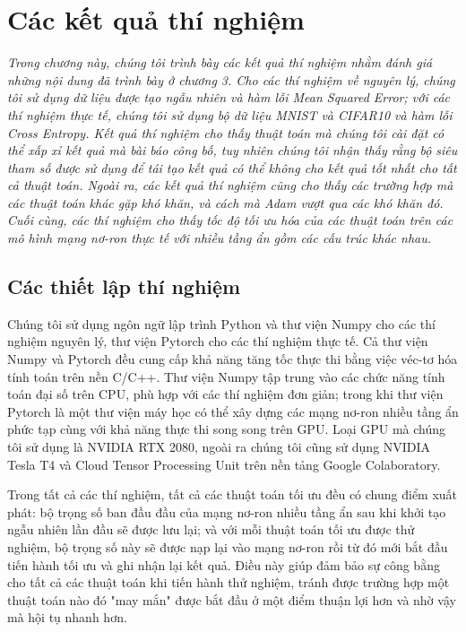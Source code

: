 \chapter{Các kết quả thí nghiệm}
\label{Chapter4}

\textit{Trong chương này, chúng tôi trình bày các kết quả thí nghiệm nhằm đánh giá những nội dung đã trình bày ở chương 3. Cho các thí nghiệm về nguyên lý, chúng tôi sử dụng dữ liệu được tạo ngẫu nhiên và hàm lỗi Mean Squared Error; với các thí nghiệm thực tế, chúng tôi sử dụng bộ dữ liệu MNIST và CIFAR10 và hàm lỗi Cross Entropy. Kết quả thí nghiệm cho thấy thuật toán mà chúng tôi cài đặt có thể xấp xỉ kết quả mà bài báo công bố, tuy nhiên chúng tôi nhận thấy rằng bộ siêu tham số được sử dụng để tái tạo kết quả có thể không cho kết quả tốt nhất cho tất cả thuật toán. Ngoài ra, các kết quả thí nghiệm cũng cho thấy các trường hợp mà các thuật toán khác gặp khó khăn, và cách mà Adam vượt qua các khó khăn đó. Cuối cùng, các thí nghiệm cho thấy tốc độ tối ưu hóa của các thuật toán trên các mô hình mạng nơ-ron thực tế với nhiều tầng ẩn gồm các cấu trúc khác nhau.}

\section{Các thiết lập thí nghiệm}

Chúng tôi sử dụng ngôn ngữ lập trình Python và thư viện Numpy cho các thí nghiệm nguyên lý, thư viện Pytorch cho các thí nghiệm thực tế. Cả thư viện Numpy và Pytorch đều cung cấp khả năng tăng tốc thực thi bằng việc véc-tơ hóa tính toán trên nền C/C++. Thư viện Numpy tập trung vào các chức năng tính toán đại số trên CPU, phù hợp với các thí nghiệm đơn giản; trong khi thư viện Pytorch là một thư viện máy học có thể xây dựng các mạng nơ-ron nhiều tầng ẩn phức tạp cùng với khả năng thực thi song song trên GPU. Loại GPU mà chúng tôi sử dụng là NVIDIA RTX 2080, ngoài ra chúng tôi cũng sử dụng NVIDIA Tesla T4 và Cloud Tensor Processing Unit trên nền tảng Google Colaboratory.

Trong tất cả các thí nghiệm, tất cả các thuật toán tối ưu đều có chung điểm xuất phát: bộ trọng số ban đầu đầu của mạng nơ-ron nhiều tầng ẩn sau khi khởi tạo ngẫu nhiên lần đầu sẽ được lưu lại; và với mỗi thuật toán tối ưu được thử nghiệm, bộ trọng số này sẽ được nạp lại vào mạng nơ-ron rồi từ đó mới bắt đầu tiến hành tối ưu và ghi nhận lại kết quả. Điều này giúp đảm bảo sự công bằng cho tất cả các thuật toán khi tiến hành thử nghiệm, tránh được trường hợp một thuật toán nào đó "may mắn" được bắt đầu ở một điểm thuận lợi hơn và nhờ vậy mà hội tụ nhanh hơn.

